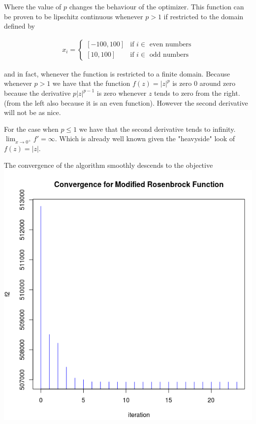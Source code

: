 Where the value of $p$ changes the behaviour of the optimizer. This function can be proven to be lipschitz continuous whenever $p > 1$ if restricted to the domain defined by 

\begin{equation}
  \begin{aligned}
    x_i = 
    \begin{cases}
      [-100, 100] & \text{if } i \in \text{ even numbers} \\
      [10, 100] & \text{if } i \in \text{ odd numbers}
    \end{cases}
  \end{aligned}
\end{equation}

and in fact, whenever the function is restricted to a finite domain. Because whenever $p > 1$ we have that the function $f(z) = |z|^p$ is zero $0$ around zero because the derivative $p |z| ^{p-1}$ is zero whenever $z$ tends to zero from the right. (from the left also because it is an even function). However the second derivative will not be as nice.

For the case when $p \leq 1$ we have that the second derivative tends to infinity. $\displaystyle \lim_{x \to 0^+} {f' = \infty}$. Which is already well known given the "heavyside" look of $f(z) = |z|$.

The convergence of the algorithm smoothly descends to the objective 
\centering
\includegraphics[scale=0.3]{Figures/convergence.png}

